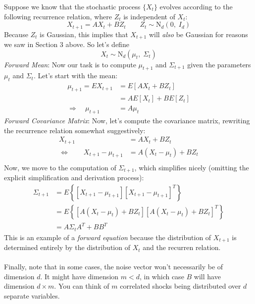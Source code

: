 \documentclass[a4paper,12pt]{scrartcl}
\begin{document}
Suppose we know that the stochastic process $\{{X}_t\}$
evolves according to the following recurrence relation,
where ${Z}_t$ is independent of ${X}_t$: 
\begin{equation}
    {X}_{t+1} = A {X}_t + B {Z}_t
    \qquad {Z}_t \sim \text{N}_d(0, \; I_d) 
\end{equation}
Because ${Z}_t$ is Gaussian, this implies that 
${X}_{t+1}$ will \emph{also} be Gaussian for reasons we saw  
in Section 3 above. So let's define
\begin{equation}
    {X}_t \sim \text{N}_d(\mu_t, \; \Sigma_t)
\end{equation}
{\sl Forward Mean}: 
Now our task is to compute $\mu_{t+1}$ and $\Sigma_{t+1}$
given the parameters $\mu_t$ and $\Sigma_t$.  Let's start with the
mean:
\begin{align*}
    \mu_{t+1} = E{X}_{t+1} &= E\left[A{X}_t +
	B {Z}_t\right] \\
    &= AE[{X}_t] + BE[{Z}_t] \\
    \Rightarrow \quad \mu_{t+1} &= A\mu_t
\end{align*}
{\sl Forward Covariance Matrix}:
Now, let's compute the covariance matrix, rewriting the recurrence 
relation somewhat suggestively:
\begin{align*}
    {X}_{t+1} &= A {X}_t + B {Z}_t \\
    \Leftrightarrow \qquad 
	{X}_{t+1} - \mu_{t+1} &= 
	A ({X}_t - \mu_t) + B {Z}_t \\
\end{align*}
Now, we move to the computation of $\Sigma_{t+1}$, which simplifies
nicely (omitting the explicit simplification and derivation process):
\begin{align*}
    \Sigma_{t+1} &= E\left\{ \left[{X}_{t+1} - \mu_{t+1} \right]
    \left[{X}_{t+1} - \mu_{t+1} \right]^T \right\} \\
    &= E\left\{ \left[A ({X}_t - \mu_t) + B {Z}_t\right]
	\left[A ({X}_t - \mu_t) + B {Z}_t\right]^T
	\right\} \\
    &= A\Sigma_t A^T + BB^T
\end{align*}
This is an example of a \emph{forward equation} because the 
distribution of ${X}_{t+1}$ is determined entirely by 
the distribution of ${X}_t$ and the recurren relation.
\\
\\
Finally, note that in some cases, the noise vector won't necessarily
be of dimension $d$.  It might have dimension $m<d$, in which 
case $B$ will have dimension $d\times m$. You can think of 
$m$ correlated shocks being distributed over $d$ separate variables.
\end{document}
